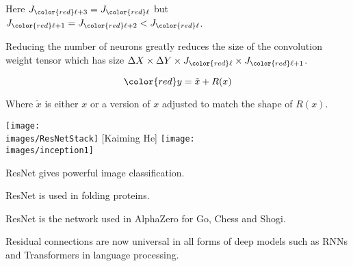 {\vfill
Here $J_{\color{red} \ell+3} = J_{\color{red} \ell}$ but $J_{\color{red} \ell+1} = J_{\color{red} \ell+2} < J_{\color{red} \ell}$.

\vfill
Reducing the number of neurons greatly reduces the size of the convolution weight tensor which has size $\Delta X \times \Delta Y \times J_{\color{red} \ell} \times J_{\color{red} \ell+1}$.


$${\color{red} y = \tilde{x} + R(x)}$$

\vfill
Where $\tilde{x}$ is either $x$ or a version of $x$ adjusted to match the shape of $R(x)$.



\centerline{\texttt{[image: \\images/ResNetStack]} {\large [Kaiming He]} \texttt{[image: \\images/inception1]}}


ResNet gives powerful image classification.

\vfill
ResNet is used in folding proteins.

\vfill
ResNet is the network used in AlphaZero for Go, Chess and Shogi.

\vfill
Residual connections are now universal in all forms of deep models such as RNNs and Transformers in language processing.


}

